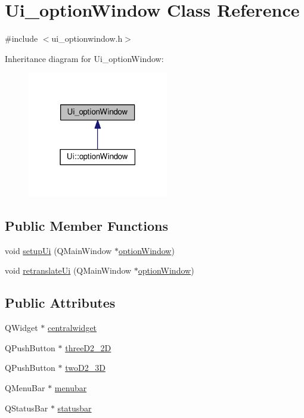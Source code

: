 \hypertarget{classUi__optionWindow}{}\section{Ui\+\_\+option\+Window Class Reference}
\label{classUi__optionWindow}


{\ttfamily \#include $<$ui\+\_\+optionwindow.\+h$>$}



Inheritance diagram for Ui\+\_\+option\+Window\+:
\nopagebreak
\begin{figure}[H]
\begin{center}
\leavevmode
\includegraphics[width=174pt]{classUi__optionWindow__inherit__graph}
\end{center}
\end{figure}
\subsection*{Public Member Functions}
\begin{DoxyCompactItemize}
\item 
void \hyperlink{classUi__optionWindow_a37f3f54b7c4cde131daddc5433d4e37d}{setup\+Ui} (Q\+Main\+Window $\ast$\hyperlink{classoptionWindow}{option\+Window})
\item 
void \hyperlink{classUi__optionWindow_a0904702fea102a0a8e79bf8efd00d6ec}{retranslate\+Ui} (Q\+Main\+Window $\ast$\hyperlink{classoptionWindow}{option\+Window})
\end{DoxyCompactItemize}
\subsection*{Public Attributes}
\begin{DoxyCompactItemize}
\item 
Q\+Widget $\ast$ \hyperlink{classUi__optionWindow_abe1b41532353eb89c040124c85e5ef94}{centralwidget}
\item 
Q\+Push\+Button $\ast$ \hyperlink{classUi__optionWindow_a5dcb7223009f3d24b4bec11b83102fff}{three\+D2\+\_\+2D}
\item 
Q\+Push\+Button $\ast$ \hyperlink{classUi__optionWindow_ae428e4702f07e7cfd83c2d3e992d89fd}{two\+D2\+\_\+3D}
\item 
Q\+Menu\+Bar $\ast$ \hyperlink{classUi__optionWindow_aee44b4440fe208d6d475364077c34701}{menubar}
\item 
Q\+Status\+Bar $\ast$ \hyperlink{classUi__optionWindow_a8329523a10b2741df733bd2afd3ae5f6}{statusbar}
\end{DoxyCompactItemize}


